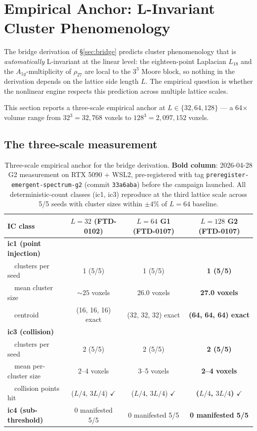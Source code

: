 \documentclass[11pt,reqno]{amsart}
\theoremstyle{plain}
\theoremstyle{definition}
\theoremstyle{remark}
\numberwithin{equation}{section}
\newcommand{\Aoneg}{A_{1g}}
\begin{document}
\section{Empirical Anchor: L-Invariant Cluster Phenomenology}
\label{sec:engine}

The bridge derivation of \S\ref{sec:bridge} predicts cluster
phenomenology that is \emph{automatically} L-invariant at the linear
level: the eighteen-point Laplacian $L_{18}$ and the
$\Aoneg$-multiplicity of $\rho_{27}$ are local to the $3^{3}$ Moore
block, so nothing in the derivation depends on the lattice side
length $L$. The empirical question is whether the nonlinear engine
respects this prediction across multiple lattice scales.

This section reports a three-scale empirical anchor at
$L \in \{32, 64, 128\}$ --- a 64$\times$ volume range from
$32^{3} = 32{,}768$ voxels to $128^{3} = 2{,}097{,}152$ voxels.

\subsection{The three-scale measurement}

\begin{table}[h]
\centering
\small
\begin{tabular}{l c c c}
\toprule
IC class & $L=32$ (FTD-0102) & $L=64$ G1 (FTD-0107) & $L=128$ G2 (FTD-0107) \\
\midrule
\textbf{ic1 (point injection)} & & & \\
~~clusters per seed & 1 (5/5) & 1 (5/5) & \textbf{1 (5/5)} \\
~~mean cluster size & $\sim 25$ voxels & 26.0 voxels & \textbf{27.0 voxels} \\
~~centroid & (16, 16, 16) exact & (32, 32, 32) exact & \textbf{(64, 64, 64) exact} \\
\midrule
\textbf{ic3 (collision)} & & & \\
~~clusters per seed & 2 (5/5) & 2 (5/5) & \textbf{2 (5/5)} \\
~~mean per-cluster size & 2--4 voxels & 3--5 voxels & \textbf{2--4 voxels} \\
~~collision points hit & ($L/4$, $3L/4$) $\checkmark$ & ($L/4$, $3L/4$) $\checkmark$ & \textbf{($L/4$, $3L/4$) $\checkmark$} \\
\midrule
\textbf{ic4 (sub-threshold)} & 0 manifested 5/5 & 0 manifested 5/5 & \textbf{0 manifested 5/5} \\
\bottomrule
\end{tabular}
\caption{Three-scale empirical anchor for the bridge derivation.
\textbf{Bold column}: 2026-04-28 G2 measurement on RTX 5090 + WSL2,
pre-registered with tag \texttt{preregister-emergent-spectrum-g2}
(commit \texttt{33a6aba}) before the campaign launched. All
deterministic-count classes (ic1, ic3) reproduce at the third lattice
scale across 5/5 seeds with cluster sizes within $\pm 4\%$ of
$L = 64$ baseline.}
\label{tab:threescale}
\end{table}
\end{document}
